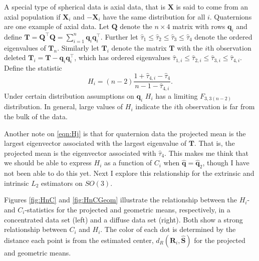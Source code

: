 \documentclass{article}\usepackage[]{graphicx}\usepackage[]{color}
\newcommand{\qest}{{\hat{\bm q}}}
\newcommand{\Sest}{{\widehat{\bm S}}}
\begin{document}
A special type of spherical data is axial data, that is $\bm X$ is said to come from an axial population if $\bm X_i$ and $-\bm X_i$ have the same distribution for all $i$.  Quaternions are one example of axial data.  Let $\bm Q$ denote the $n\times 4$ matrix with rows $\bm q_i$ and define $\bm T=\bm Q^\top\bm Q=\sum_{i=1}^n\bm q_i\bm q_i^\top$.  Further let $\hat\tau_1\leq\hat\tau_2\leq\hat\tau_3\leq\hat\tau_4$ denote the ordered eigenvalues of $\bm T_n$.  Similarly let $\bm T_{i}$ denote the matrix $\bm T$ with the $i$th observation deleted $\bm T_i=\bm T-\bm q_i\bm q_i^\top$, which has ordered eigenvalues $\hat\tau_{1,i}\leq\hat\tau_{2,i}\leq\hat\tau_{3,i}\leq\hat\tau_{4,i}$.  Define the statistic
\begin{equation}\label{eqn:Hj}
H_i=(n-2)\frac{1+\hat\tau_{4,i}-\hat\tau_4}{n-1-\hat\tau_{4,i}}.
\end{equation}
Under certain distribution assumptions on $\bm q_i$  $H_i$ has a limiting $F_{3,3(n-2)}$ distribution.  In general, large values of $H_i$ indicate the $i$th observation is far from the bulk of the data.

Another note on \eqref{eqn:Hj} is that for quaternion data the projected mean is the largest eigenvector associated with the largest eigenvalue of $\bm T$.  That is, the projected mean is the eigenvector associated with $\hat\tau_4$.  This makes me think that we should be able to express $H_i$ as a function of $C_i$ when $\qest=\hat{\bm q}_2$, though I have not been able to do this yet.  Next I explore this relationship for the extrinsic and intrinsic $L_2$ estimators on $SO(3)$. 


Figures \ref{fig:HnC} and \ref{fig:HnCGeom} illustrate the relationship between the $H_i$- and $C_i$-statistics for the projected and geometric means, respectively, in a concentrated data set (left) and a diffuse data set (right).  Both show a strong relationship between $C_i$ and $H_i$.  The color of each dot is determined by the distance each point is from the estimated center, $d_R(\bm R_i,\Sest)$ for the projected and geometric means.
\end{document}
